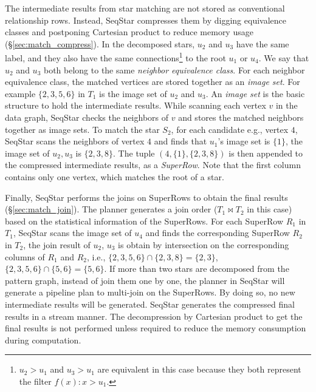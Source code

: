 The intermediate results from star matching are not stored as conventional relationship rows.
Instead, SeqStar compresses them by digging equivalence classes and postponing Cartesian product to reduce memory usage (\S\ref{sec:match_compress}).
In the decomposed stars, $u_2$ and $u_3$ have the same label, and they also have the same connections\footnote{$u_2 > u_1$ and $u_3 > u_1$ are equivalent in this case because they both represent the filter $f(x): x > u_1$.} to the root $u_1$ or $u_4$.
We say that $u_2$ and $u_3$ both belong to the same \emph{neighbor equivalence class}.
For each neighbor equivalence class, the matched vertices are stored together as an \emph{image set}.
For example $\{2, 3, 5, 6\}$ in $T_1$ is the image set of $u_2$ and $u_3$.
An \emph{image set} is the basic structure to hold the intermediate results.
While scanning each vertex $v$ in the data graph,
SeqStar checks the neighbors of $v$ and stores the matched neighbors together as image sets.
To match the star $S_2$,
for each candidate e.g., vertex $4$, SeqStar scans the neighbors of vertex $4$ and finds that $u_1$'s image set is $\{1\}$,
the image set of $u_2, u_3$ is $\{2, 3, 8\}$.
The tuple $(4, \{1\}, \{2, 3, 8\})$ is then appended to the compressed intermediate results, as a \emph{SuperRow}.
Note that the first column contains only one vertex, which matches the root of a star.

Finally, SeqStar performs the joins on SuperRows to obtain the final results (\S\ref{sec:match_join}). The planner generates a join order ($T_1 \Join T_2$ in this case) based on the statistical information of the SuperRows.
For each SuperRow $R_1$ in $T_1$, SeqStar scans the image set of $u_4$ and finds the corresponding SuperRow $R_2$ in $T_2$,
the join result of $u_2$, $u_3$ is obtain by intersection on the corresponding columns of $R_1$ and $R_2$,
i.e., $\{2, 3, 5, 6\} \cap \{2, 3, 8\} = \{2, 3\}$, $\{2, 3, 5, 6\} \cap \{5, 6\} = \{5, 6\}$.
If more than two stars are decomposed from the pattern graph,
instead of join them one by one,
the planner in SeqStar will generate a pipeline plan to multi-join on the SuperRows.
By doing so, no new intermediate results will be generated.
SeqStar generates the compressed final results in a stream manner.
The decompression by Cartesian product to get the final results is not performed unless required to reduce the memory consumption during computation.


